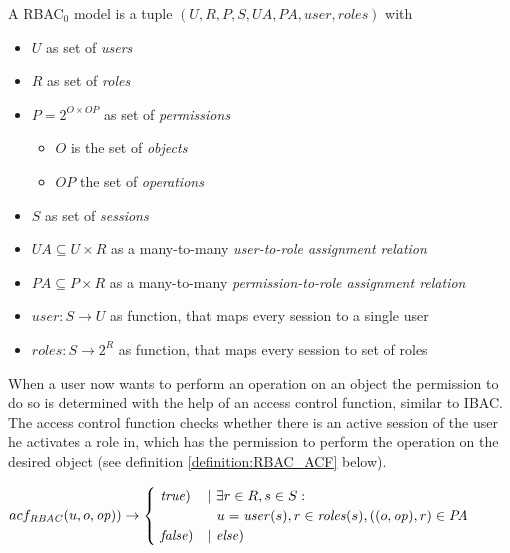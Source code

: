 \documentclass[twoside, openright, 12pt]{book}
\begin{document}
\begin{xdefinition}[RBAC] 
A RBAC$_0$ model is a tuple $(U, R, P, S, \mathit{UA}, \mathit{PA}, \mathit{user}, \mathit{roles})$ with

\vspace{-2mm}
\begin{itemize}
\setlength\itemsep{0em}
\item $U$ as set of \textit{users}
\item $R$ as set of \textit{roles}
\item $P = 2^{O \times \mathit{OP}}$ as set of \textit{permissions}
\vspace{-2mm}
\begin{itemize}
\item $O$ is the set of \textit{objects}
\item $\mathit{OP}$ the set of \textit{operations}
\end{itemize}
\vspace{-2mm}
\item $S$ as set of \textit{sessions}
\item $\mathit{UA} \subseteq U \times R$ as a many-to-many \textit{user-to-role assignment relation}
\item $\mathit{PA} \subseteq P \times R$ as a many-to-many \textit{permission-to-role assignment relation}
\item $\mathit{user}: S \rightarrow U$ as function, that maps every session to a single user
\item $\mathit{roles}: S \rightarrow 2^R$ as function, that maps every session to set of roles
\end{itemize}
\label{definition:RBAC}
\end{xdefinition}

\noindent
When a user now wants to perform an operation on an object the permission to do so is determined with the help of an access control function, similar to IBAC.
The access control function checks whether there is an active session of the user he activates a role in, which has the permission to perform the operation on the desired object (see definition \ref{definition:RBAC_ACF} below).

\begin{xdefinition}
$\\[-15pt]
acf_{\mathit{RBAC}} (u, o, \mathit{op})) \rightarrow 
   \begin{cases}
   		\ \mathit{true}) & |\ \exists r \in R, s \in S: \\ & \ \ u = \mathit{user}(s), r \in \mathit{roles}(s), ((o, \mathit{op}), r) \in \mathit{PA} \\
   		\ \mathit{false}) & |\ \mathit{else})
   \end{cases}
$
\label{definition:RBAC_ACF}
\end{xdefinition}
\end{document}
